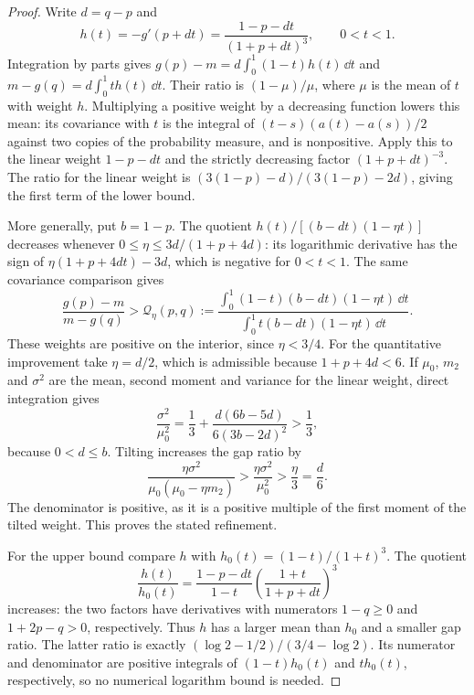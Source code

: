 \begin{proof}
Write $d=q-p$ and
\[
 h(t)=-g'(p+dt)=\frac{1-p-dt}{(1+p+dt)^3},\qquad 0<t<1.
\]
Integration by parts gives
$g(p)-m=d\int_0^1(1-t)h(t)\,\dd t$ and
$m-g(q)=d\int_0^1th(t)\,\dd t$.
Their ratio is $(1-\mu)/\mu$, where $\mu$ is the mean of $t$ with weight $h$.
Multiplying a positive weight by a decreasing function lowers this mean: its covariance
with $t$ is the integral of $(t-s)(a(t)-a(s))/2$ against two copies of the probability measure,
and is nonpositive. Apply this to the linear weight $1-p-dt$ and the strictly decreasing
factor $(1+p+dt)^{-3}$. The ratio for the linear weight is
$(3(1-p)-d)/(3(1-p)-2d)$, giving the first term of the lower bound.

More generally, put $b=1-p$. The quotient $h(t)/[(b-dt)(1-\eta t)]$ decreases whenever
$0\le\eta\le3d/(1+p+4d)$: its logarithmic derivative has the sign of
$\eta(1+p+4dt)-3d$, which is negative for $0<t<1$. The same covariance comparison gives
\begin{equation}\label{eq:ss-gap-tilt}
 \frac{g(p)-m}{m-g(q)}>
 \mathcal Q_\eta(p,q):=
 \frac{\int_0^1(1-t)(b-dt)(1-\eta t)\,\dd t}
      {\int_0^1t(b-dt)(1-\eta t)\,\dd t}.
\end{equation}
These weights are positive on the interior, since $\eta<3/4$.
For the quantitative improvement take $\eta=d/2$, which is admissible because
$1+p+4d<6$. If $\mu_0$, $m_2$ and $\sigma^2$ are the mean, second moment and variance
for the linear weight, direct integration gives
\[
 \frac{\sigma^2}{\mu_0^2}
 =\frac13+\frac{d(6b-5d)}{6(3b-2d)^2}>\frac13,
\]
because $0<d\le b$. Tilting increases the gap ratio by
\[
 \frac{\eta\sigma^2}{\mu_0(\mu_0-\eta m_2)}
 >\frac{\eta\sigma^2}{\mu_0^2}>\frac\eta3=\frac d6.
\]
The denominator is positive, as it is a positive multiple of the first moment of the tilted
weight. This proves the stated refinement.

For the upper bound compare $h$ with $h_0(t)=(1-t)/(1+t)^3$. The quotient
\[
 \frac{h(t)}{h_0(t)}
 =\frac{1-p-dt}{1-t}\left(\frac{1+t}{1+p+dt}\right)^3
\]
increases: the two factors have derivatives with numerators $1-q\ge0$ and
$1+2p-q>0$, respectively. Thus $h$ has a larger mean than $h_0$ and a smaller gap ratio.
The latter ratio is exactly $(\log2-1/2)/(3/4-\log2)$. Its numerator and denominator are
positive integrals of $(1-t)h_0(t)$ and $th_0(t)$, respectively, so no numerical logarithm
bound is needed.
\end{proof}

